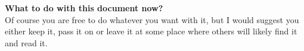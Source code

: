 {%
\textbf{What to do with this document now?}\\

Of course you are free to do whatever you want with it, but I would suggest 
you either keep it, pass it on or leave it at some place where others will 
likely find it and read it.\\




\clearpage
\newpage
\ \\
\newpage
\thispagestyle{empty}
}
